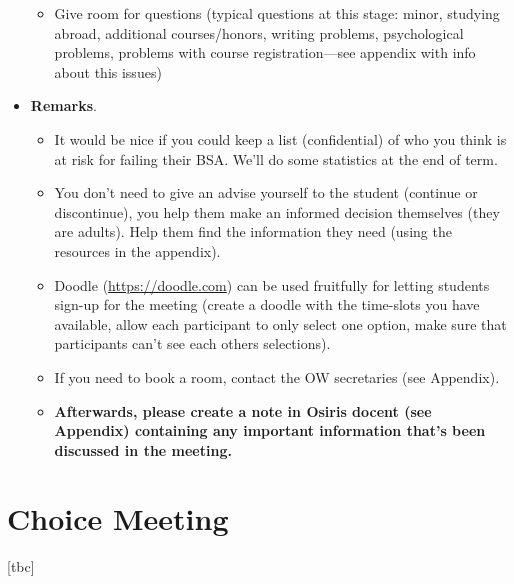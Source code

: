 \begin{itemize}
\begin{itemize}
			\item Give room for questions (typical questions at this stage: minor, studying abroad, additional courses/honors, writing problems, psychological problems, problems with course registration---see appendix with info about this issues)

		\end{itemize}

		\item \textbf{Remarks}.

		\begin{itemize}

			\item It would be nice if you could keep a list (confidential) of who you think is at risk for failing their BSA. We'll do some statistics at the end of term.

			\item You don't need to give an advise yourself to the student (continue or discontinue), you help them make an informed decision themselves (they are adults).
                          Help them find the information they need (using the resources in the appendix).

			\item Doodle (\url{https://doodle.com}) can be used fruitfully for letting students sign-up for the meeting (create a doodle with the time-slots you have available, allow each participant to only select one option, make sure that participants can't see each others selections).

			\item If you need to book a room, contact the OW secretaries (see Appendix).

			\item \textbf{Afterwards, please create a note in Osiris docent (see Appendix) containing any important information that's been discussed in the meeting.}

		\end{itemize}

	\end{itemize}

\section{Choice Meeting}

[tbc]

